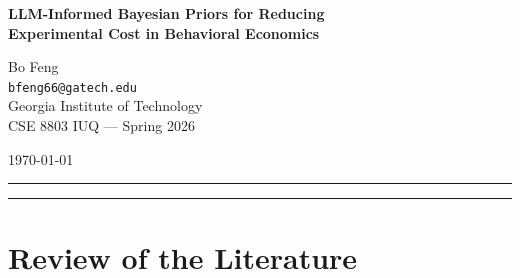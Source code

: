 \documentclass[11pt]{article}
\begin{document}
\begin{center}
  {\Large\bfseries LLM-Informed Bayesian Priors for Reducing\\
  Experimental Cost in Behavioral Economics}

  \vspace{0.8em}

  {\normalsize
    Bo Feng\\
    \texttt{bfeng66@gatech.edu}\\
    Georgia Institute of Technology\\
    CSE 8803 IUQ — Spring 2026
  }

  \vspace{0.8em}
  {\small \today}
\end{center}

\vspace{0.5em}
\hrule
\vspace{1em}

\begin{abstract}
Human experiments in behavioral economics are expensive, yet large
language models (LLMs) exhibit qualitatively human-like behavior in
classic economic games~\citep{horton2023homosilicus} and encode
knowledge equivalent to dozens of human observations for economic
variables~\citep{gao2026measure}.
We propose a Bayesian framework in which LLM simulations serve as an
informative prior and real human observations provide the likelihood,
keeping the two data sources in strictly separate roles to avoid
methodological circularity.
Our primary metric is the \emph{sample size reduction ratio}
$\rho = n^*_{\mathrm{LLM}} / n^*_{\mathrm{flat}}$: the minimum human
observations needed to reach a target posterior precision under the
LLM prior versus a flat prior.
We implement a flat-prior MCMC baseline and an LLM-informed SVGD
frontier method, and evaluate both on dictator-game and ultimatum-game
data from \citet{horton2023homosilicus}.
\end{abstract}

\vspace{1em}
\hrule
\vspace{1em}

\section{Review of the Literature}
\end{document}
